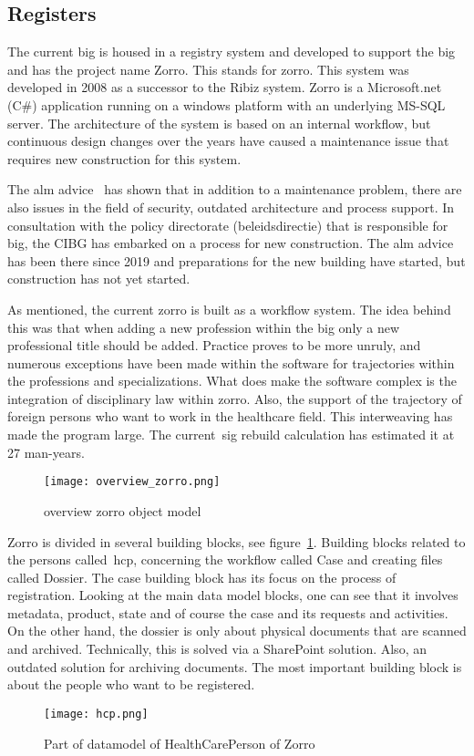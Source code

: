 \subsection{Registers} \label{registers}
The current \acrshort{big} is housed in a registry system and developed to support the \acrshort{big} and has the project name Zorro.
This stands for \acrlong{zorro}.
This system was developed in 2008 as a successor to the Ribiz system.
Zorro is a Microsoft.net (C\#) application running on a windows platform with an underlying MS-SQL server.
The architecture of the system is based on an internal workflow, but continuous design changes over the years have caused a maintenance issue that requires new construction for this system.

The \acrfull{alm} advice~ has shown that in addition to a maintenance problem, there are also issues in the field of security, outdated architecture and process support.
In consultation with the policy directorate (beleidsdirectie) that is responsible for \acrshort{big}, the CIBG has embarked on a process for new construction.
The \acrshort{alm} advice has been there since 2019 and preparations for the new building have started, but construction has not yet started.

As mentioned, the current \acrshort{zorro} is built as a workflow system.
The idea behind this was that when adding a new profession within the \acrshort{big} only a new professional title should be added.
Practice proves to be more unruly, and numerous exceptions have been made within the software for trajectories within the professions and specializations.
What does make the software complex is the integration of disciplinary law within \acrshort{zorro}.
Also, the support of the trajectory of foreign persons who want to work in the healthcare field.
This interweaving has made the program large.
The current~\acrfull{sig} rebuild calculation has estimated it at 27 man-years.

\begin{figure}[!h]
\texttt{[image: overview\_zorro.png]}
\caption{overview zorro object model}
\label{fig:overview_zorro}
\end{figure}
Zorro is divided in several building blocks, see figure~\ref{fig:overview_zorro}.
Building blocks related to the persons called~\acrfull{hcp}, concerning the workflow called Case and creating files called Dossier.
The case building block has its focus on the process of registration. 
Looking at the main data model blocks, one can see that it involves metadata, product, state and of course the case and its requests and activities.
On the other hand, the dossier is only about physical documents that are scanned and archived.
Technically, this is solved via a SharePoint solution.
Also, an outdated solution for archiving documents.
The most important building block is about the people who want to be registered.
\begin{figure}
    \centering
    \texttt{[image: hcp.png]}
    \caption{Part of datamodel of HealthCarePerson of Zorro}
    \label{fig:hcp}
\end{figure}

